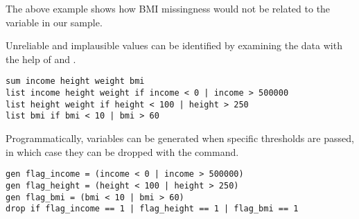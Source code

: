 The above example shows how BMI missingness would not be related to the  variable in our sample.


Unreliable and implausible values can be identified by examining the data with the help of  and . 

\begin{verbatim}
sum income height weight bmi
list income height weight if income < 0 | income > 500000
list height weight if height < 100 | height > 250
list bmi if bmi < 10 | bmi > 60
\end{verbatim}

Programmatically,  variables can be generated when specific thresholds are passed, in which case they can be dropped with the  command.

\begin{verbatim}
gen flag_income = (income < 0 | income > 500000)
gen flag_height = (height < 100 | height > 250)
gen flag_bmi = (bmi < 10 | bmi > 60)
drop if flag_income == 1 | flag_height == 1 | flag_bmi == 1
\end{verbatim}